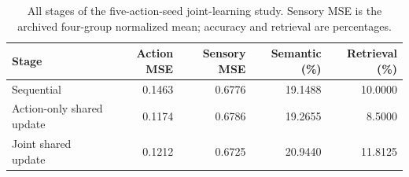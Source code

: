 \begin{table}[tbp]
\centering\small
\caption{All stages of the five-action-seed joint-learning study. Sensory MSE is the archived four-group normalized mean; accuracy and retrieval are percentages.}
\label{tab:joint_stages}
\begin{tabular}{@{}lrrrr@{}}
\toprule
Stage & Action MSE & Sensory MSE & Semantic (\%) & Retrieval (\%) \\
\midrule
Sequential & 0.1463 & 0.6776 & 19.1488 & 10.0000 \\
Action-only shared update & 0.1174 & 0.6786 & 19.2655 & 8.5000 \\
Joint shared update & 0.1212 & 0.6725 & 20.9440 & 11.8125 \\
\bottomrule
\end{tabular}
\end{table}
